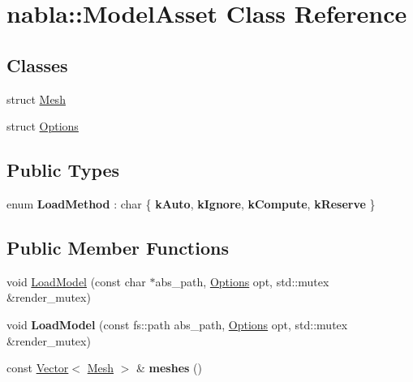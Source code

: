\hypertarget{classnabla_1_1_model_asset}{}\section{nabla\+::Model\+Asset Class Reference}
\label{classnabla_1_1_model_asset}
\subsection*{Classes}
\begin{DoxyCompactItemize}
\item 
struct \mbox{\hyperlink{structnabla_1_1_model_asset_1_1_mesh}{Mesh}}
\item 
struct \mbox{\hyperlink{structnabla_1_1_model_asset_1_1_options}{Options}}
\end{DoxyCompactItemize}
\subsection*{Public Types}
\begin{DoxyCompactItemize}
\item 
\mbox{\label{classnabla_1_1_model_asset_a7a792aa84a8296f68ce5c99287b5528b}} 
enum {\bfseries Load\+Method} \+: char \{ {\bfseries k\+Auto}, 
{\bfseries k\+Ignore}, 
{\bfseries k\+Compute}, 
{\bfseries k\+Reserve}
 \}
\end{DoxyCompactItemize}
\subsection*{Public Member Functions}
\begin{DoxyCompactItemize}
\item 
void \mbox{\hyperlink{classnabla_1_1_model_asset_a9ca69dcb412880e8d09ae86f989fc5b4}{Load\+Model}} (const char $\ast$abs\+\_\+path, \mbox{\hyperlink{structnabla_1_1_model_asset_1_1_options}{Options}} opt, std\+::mutex \&render\+\_\+mutex)
\item 
\mbox{\label{classnabla_1_1_model_asset_aa28c7a2d9ed414cc7d8a4acf2a560631}} 
void {\bfseries Load\+Model} (const fs\+::path abs\+\_\+path, \mbox{\hyperlink{structnabla_1_1_model_asset_1_1_options}{Options}} opt, std\+::mutex \&render\+\_\+mutex)
\item 
\mbox{\label{classnabla_1_1_model_asset_ac31ca095c93dc063cb7fd5569552f586}} 
const \mbox{\hyperlink{classnabla_1_1_s_t_l_vector_ex}{Vector}}$<$ \mbox{\hyperlink{structnabla_1_1_model_asset_1_1_mesh}{Mesh}} $>$ \& {\bfseries meshes} ()
\end{DoxyCompactItemize}


